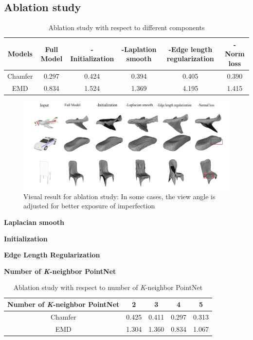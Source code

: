 \subsection{Ablation study}
\begin{table}
	\caption{Ablation study with respect to different components}
	\label{tab:ablation}
	\centering
	\begin{tabular}{c | c c c c c}
		Models &  Full Model  & -Initialization & -Laplation smooth & -Edge length regularization & -Norm loss \\
		\hline
		Chamfer      & 0.297 & 0.424 & 0.394 & 0.405  & 0.390\\
		EMD			 & 0.834 & 1.524 & 1.369 & 4.195  & 1.415
	\end{tabular}
\end{table}
\begin{figure}[htbp]
	\centering
	\includegraphics[width=\linewidth]{img/abl/abl}
	\caption{Visual result for ablation study: In some cases, the view angle is adjusted for better exposure of imperfection}
	\label{fig:abl}
\end{figure}
\noindent\textbf{Laplacian smooth}

\noindent\textbf{Initialization}

\noindent\textbf{Edge Length Regularization}

\noindent\textbf{Number of \textit{K}-neighbor PointNet}
\begin{table}
	\caption{Ablation study with respect to number of \textit{K}-neighbor PointNet}
	\label{tab:pointnet}
	\centering
	\begin{tabular}{c | c c c c}
		Number of \textit{K}-neighbor PointNet &  2 & 3 & 4 & 5 \\
		\hline
		Chamfer      & 0.425 &  0.411 & 0.297 & 0.313 \\
		EMD			 & 1.304 &  1.360 & 0.834 & 1.067
	\end{tabular}
\end{table}
